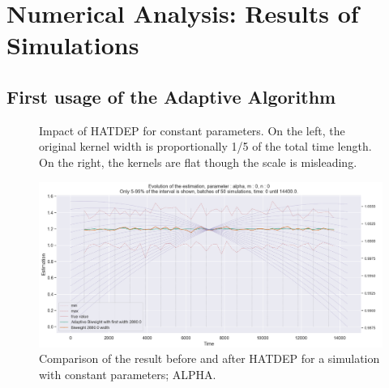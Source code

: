 \chapter{Numerical Analysis: Results of Simulations}


\section{First usage of the Adaptive Algorithm}


\begin{figure}
\centering
{} 
\caption{Impact of HATDEP for constant parameters. On the left, the original kernel width is proportionally 1/5 of the total time length. On the right, the kernels are flat though the scale is misleading.}
\label{fig:compar_kernels_0}
\end{figure}


\begin{figure}
\centering
\includegraphics[width = 0.90 \textwidth]{../imag/chap3/0/A.png}
\caption{Comparison of the result before and after HATDEP for a simulation with constant parameters; ALPHA.}
\label{fig:first_estimate_0_alpha}
\end{figure}

